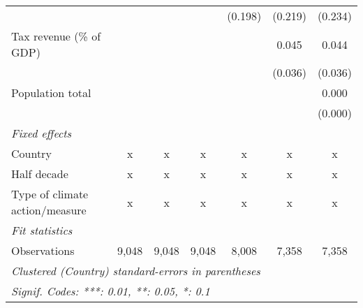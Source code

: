 \begin{tabular}{lcccccc}
                                                                &         &         &               & (0.198)       & (0.219)      & (0.234)\\   
   Tax revenue (\% of GDP)                                      &         &         &               &               & 0.045        & 0.044\\   
                                                                &         &         &               &               & (0.036)      & (0.036)\\   
   Population total                                             &         &         &               &               &              & 0.000\\   
                                                                &         &         &               &               &              & (0.000)\\   
   \emph{Fixed effects}\\
   Country                                                      & x       & x       & x             & x             & x            & x\\  
   Half decade                                                  & x       & x       & x             & x             & x            & x\\  
   Type of climate action/measure                               & x       & x       & x             & x             & x            & x\\  
   \midrule \emph{Fit statistics}\\
   Observations                                                 & 9,048   & 9,048   & 9,048         & 8,008         & 7,358        & 7,358\\  
   \midrule
   \multicolumn{7}{l}{\emph{Clustered (Country) standard-errors in parentheses}}\\
   \multicolumn{7}{l}{\emph{Signif. Codes: ***: 0.01, **: 0.05, *: 0.1}}\\
\end{tabular}
\par\endgroup


